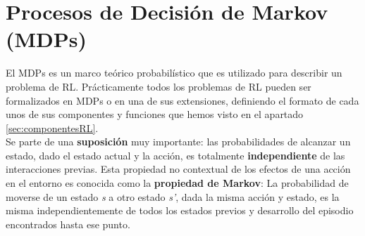 \documentclass[11pt,fleqn]{book} %
\begin{document}
%
%
%	

\section{Procesos de Decisión de Markov (MDPs)}\label{sec:markov}

El MDPs es un marco teórico probabilístico que es utilizado para describir un problema de RL. Prácticamente todos los problemas de RL pueden ser formalizados en MDPs o en una de sus extensiones, definiendo el formato de cada unos de sus componentes y funciones que hemos visto en el apartado \ref{sec:componentesRL}. \\

Se parte de una \textbf{suposición} muy importante: las probabilidades de alcanzar un estado, dado el estado actual y la acción, es totalmente \textbf{independiente} de las interacciones previas. Esta propiedad no contextual de los efectos de una acción en el entorno es conocida como la \textbf{propiedad de Markov}: La probabilidad de moverse de un estado \textit{s} a otro estado \textit{s'}, dada la misma acción y estado, es la misma independientemente de todos los estados previos y desarrollo del episodio encontrados hasta ese punto.
\end{document}
